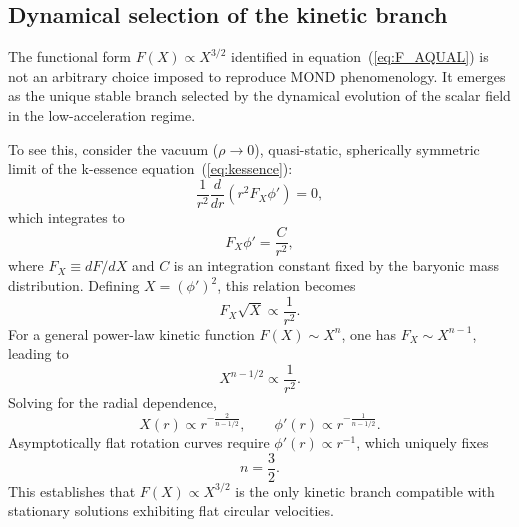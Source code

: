\documentclass[11pt,a4paper]{article}
\begin{document}
\subsection{Dynamical selection of the kinetic branch}
\label{subsec:FX_attractor}

The functional form $F(X) \propto X^{3/2}$ identified in
equation~(\ref{eq:F_AQUAL}) is not an arbitrary choice imposed to reproduce
MOND phenomenology. It emerges as the unique stable branch selected by the
dynamical evolution of the scalar field in the low-acceleration regime.

To see this, consider the vacuum ($\rho \to 0$), quasi-static, spherically
symmetric limit of the k-essence equation~(\ref{eq:kessence}):
\begin{equation}
  \frac{1}{r^2}\frac{d}{dr}\left(r^2 F_X \phi'\right) = 0,
\end{equation}
which integrates to
\begin{equation}
  F_X \phi' = \frac{C}{r^2},
\end{equation}
where $F_X \equiv dF/dX$ and $C$ is an integration constant fixed by the
baryonic mass distribution. Defining $X = (\phi')^2$, this relation becomes
\begin{equation}
  F_X \sqrt{X} \propto \frac{1}{r^2}.
\end{equation}
For a general power-law kinetic function $F(X)\sim X^n$, one has
$F_X \sim X^{n-1}$, leading to
\begin{equation}
  X^{n - 1/2} \propto \frac{1}{r^2}.
\end{equation}
Solving for the radial dependence,
\begin{equation}
  X(r) \propto r^{-\frac{2}{n - 1/2}},
  \qquad
  \phi'(r) \propto r^{-\frac{1}{n - 1/2}}.
\end{equation}
Asymptotically flat rotation curves require $\phi'(r) \propto r^{-1}$,
which uniquely fixes
\begin{equation}
  n = \frac{3}{2}.
\end{equation}
This establishes that $F(X)\propto X^{3/2}$ is the only kinetic branch
compatible with stationary solutions exhibiting flat circular velocities.
\end{document}

